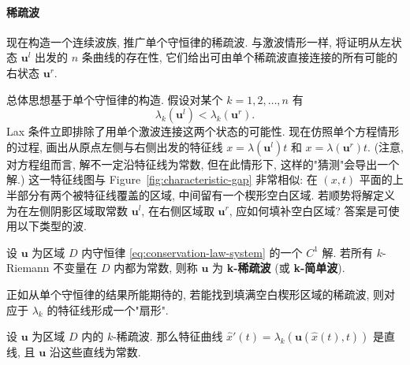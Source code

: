\paragraph*{稀疏波}

现在构造一个连续波族, 推广单个守恒律的稀疏波. 与激波情形一样, 将证明从左状态 $\bm{u}^l$ 出发的 $n$ 条曲线的存在性, 它们给出可由单个稀疏波直接连接的所有可能的右状态 $\bm{u}^r$.

总体思想基于单个守恒律的构造. 假设对某个 $k=1,2,\ldots,n$ 有
\begin{equation}\label{eq:rarefaction-increasing-characteristic-speed}
\lambda_k(\bm{u}^l)<\lambda_k(\bm{u}^r).
\end{equation}
Lax 条件立即排除了用单个激波连接这两个状态的可能性. 现在仿照单个方程情形的过程, 画出从原点左侧与右侧出发的特征线 $x=\lambda(\bm{u}^l)t$ 和 $x=\lambda(\bm{u}^r)t$. (注意, 对方程组而言, 解不一定沿特征线为常数, 但在此情形下, 这样的"猜测"会导出一个解.) 这一特征线图与 Figure~\ref{fig:characteristic-gap} 非常相似: 在 $(x,t)$ 平面的上半部分有两个被特征线覆盖的区域, 中间留有一个楔形空白区域. 若顺势将解定义为在左侧阴影区域取常数 $\bm{u}^l$, 在右侧区域取 $\bm{u}^r$, 应如何填补空白区域? 答案是可使用以下类型的波.

\begin{Definition}
\label{def:system-simple-wave}
设 $\bm{u}$ 为区域 $D$ 内守恒律 \eqref{eq:conservation-law-system} 的一个 $C^1$ 解. 若所有 $k$-Riemann 不变量在 $D$ 内都为常数, 则称 $\bm{u}$ 为 \textbf{k-稀疏波} (或 \textbf{k-简单波}).
\end{Definition}

正如从单个守恒律的结果所能期待的, 若能找到填满空白楔形区域的稀疏波, 则对应于 $\lambda_k$ 的特征线形成一个"扇形".

\begin{Theorem}
\label{thm:system-rarefaction-straight-characteristics}
设 $\bm{u}$ 为区域 $D$ 内的 $k$-稀疏波. 那么特征曲线 $\hat x'(t)=\lambda_k(\bm{u}(\hat x(t),t))$ 是直线, 且 $\bm{u}$ 沿这些直线为常数.
\end{Theorem}

